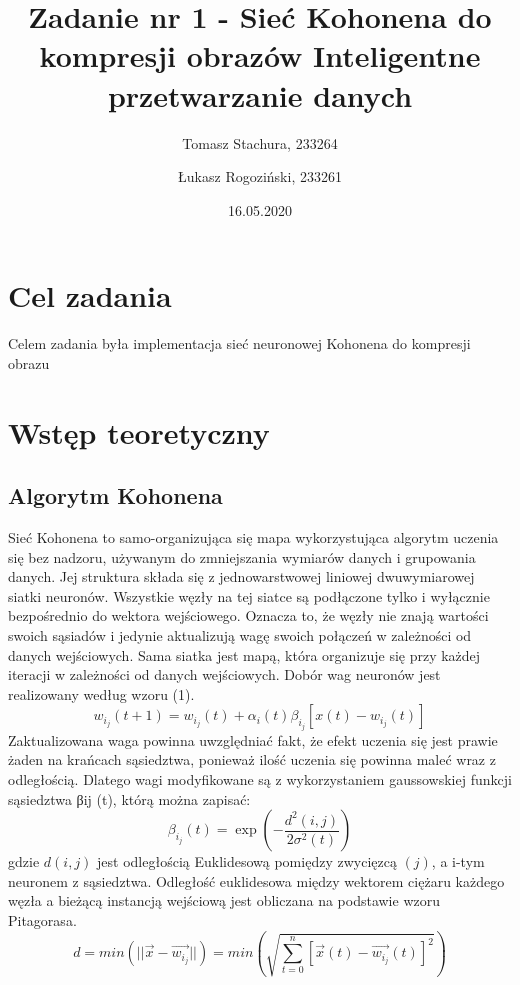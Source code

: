 \documentclass[12pt]{article}
\title{{\bf Zadanie nr 1 -  Sieć Kohonena do kompresji obrazów}\linebreak
Inteligentne przetwarzanie danych}
\author{Tomasz Stachura, 233264 \and Łukasz Rogoziński, 233261}
\date{16.05.2020}
\begin{document}
\clearpage\maketitle
\thispagestyle{empty}
\newpage
\setcounter{page}{1}
\section{Cel zadania}
Celem zadania była implementacja sieć neuronowej Kohonena do kompresji obrazu

\section{Wstęp teoretyczny}

\subsection{Algorytm Kohonena}
 Sieć Kohonena to samo-organizująca się mapa wykorzystująca  algorytm uczenia się bez nadzoru, używanym do zmniejszania wymiarów danych i grupowania danych. Jej struktura składa się z jednowarstwowej liniowej dwuwymiarowej siatki neuronów. Wszystkie węzły na tej siatce są podłączone tylko i wyłącznie bezpośrednio do wektora wejściowego. Oznacza to, że węzły nie znają wartości swoich sąsiadów i jedynie aktualizują wagę swoich połączeń w zależności od danych wejściowych. Sama siatka jest mapą, która organizuje się przy każdej iteracji w zależności od danych wejściowych. Dobór wag neuronów jest realizowany według wzoru (1).
\begin{equation}
    w_i_j(t+1)= w_i_j(t)+\alpha_i(t)\beta_i_j[x(t)-w_i_j(t)]
\end{equation}
 Zaktualizowana waga powinna uwzględniać fakt, że efekt uczenia się jest prawie żaden na krańcach sąsiedztwa, ponieważ ilość uczenia się powinna maleć wraz z odległością. Dlatego wagi modyfikowane są z wykorzystaniem gaussowskiej funkcji sąsiedztwa βij (t), którą można zapisać:
\begin{equation}
\beta_i_j(t)=\exp\left(-\frac{d^2(i,j)}{2\sigma^2(t)}\right)
\end{equation}
gdzie $d(i,j)$ jest odległością Euklidesową pomiędzy zwycięzcą $(j)$, a i-tym
neuronem z sąsiedztwa. Odległość euklidesowa między wektorem ciężaru każdego węzła a bieżącą instancją wejściową jest obliczana na podstawie wzoru Pitagorasa.
\begin{equation}
d = min( || \overrightarrow{x} - \overrightarrow{w_i_j} || ) =min \left(\sqrt{\sum_{t=0}^{n}[\overrightarrow{x}(t) - \overrightarrow{w_i_j}(t)]^{2}}\right)
\end{equation}
\end{document}

